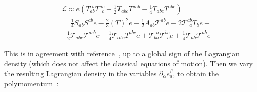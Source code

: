 \documentclass[11pt]{book}
\begin{document}
\begin{equation}\begin{aligned}
    &\mathcal{L}\approx e\left(T_{a b}^{\ \ b} T^{a c}_{\ \ c} - \frac{1}{2} T_{a b c} T^{a c b} - \frac{1}{4}T_{a b c} T^{a b c}\right)=\\
    &=\frac{1}{4}S_{a b} S^{a b} e - \frac{2}{3}(T)^2 e - \frac{1}{2}A_{a b} \mathcal{T}^{a b} e 
    -2 \mathcal{T}^{a b}_{\ \ a} T_{b} e+\\ 
    &- \frac{1}{2}\mathcal{T}_{a b c} \mathcal{T}^{a c b} e - \frac{1}{4} \mathcal{T}_{a b c} T^{a b c}e+\mathcal{T}_{b a}^{\ \ a} \mathcal{T}^{b c}_{\ \ c} e+\frac{1}{4}\mathcal{T}_{a b} \mathcal{T}^{a b} e \end{aligned}\end{equation}

This is in agreement with
reference~\cite{Aldrovandi2012Teleparallel}, up to a global sign of the Lagrangian density (which
does not affect the classical equations of motion). Then we vary the
resulting Lagrangian density in the variables
\(\partial_{\alpha}{e^{\beta}_{a}}\), to obtain the
polymomentum~\cite{Kanatchikov1998Canonical}:
\end{document}
